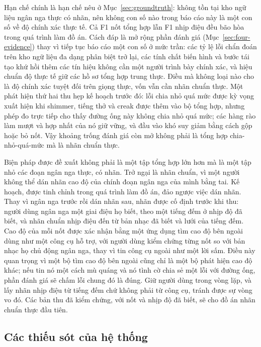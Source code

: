 \documentclass[12pt,a4paper]{article}
\begin{document}
Hạn chế chính là hạn chế nêu ở Mục~\ref{sec:groundtruth}: không tồn tại kho ngữ liệu
ngân nga thực có nhãn, nên không con số nào trong báo cáo này là một con số về độ
chính xác thực tế. Cả F1 nốt tổng hợp lẫn F1 nhịp điệu đều bão hòa trong quá trình
làm đồ án. Cách đáp là mở rộng phần đánh giá (Mục~\ref{sec:four-evidence}) thay vì
tiếp tục báo cáo một con số ở mức trần: các tỷ lệ lỗi chẩn đoán trên kho ngữ liệu đa
dạng phân biệt trở lại, các tính chất biến hình và bước tái tạo khứ hồi thêm các tín
hiệu không cần một người trình bày chính xác, và hiệu chuẩn độ thực tế giữ các hồ sơ
tổng hợp trung thực. Điều mà không loại nào cho là độ chính xác tuyệt đối trên giọng
thực, vốn vẫn cần nhãn chuẩn thực. Một phát hiện thứ hai thu hẹp kế hoạch trước đó:
lỗi chia nhỏ quá mức được kỳ vọng xuất hiện khi shimmer, tiếng thở và creak được
thêm vào bộ tổng hợp, nhưng phép đo trực tiếp cho thấy đường ống này không chia nhỏ
quá mức; các hàng rào làm mượt và hợp nhất của nó giữ vững, và đầu vào khó suy giảm
bằng cách gộp hoặc bỏ nốt. Vậy khoảng trống đánh giá còn mở không phải là tổng hợp
chia-nhỏ-quá-mức mà là nhãn chuẩn thực.

Biện pháp được đề xuất không phải là một tập tổng hợp lớn hơn mà là một tập nhỏ các
đoạn ngân nga thực, có nhãn. Trở ngại là nhãn chuẩn, vì một người không thể dán nhãn
cao độ của chính đoạn ngân nga của mình bằng tai. Kế hoạch, được tinh chỉnh trong
quá trình làm đồ án, đảo ngược việc dán nhãn. Thay vì ngân nga trước rồi dán nhãn
sau, nhãn được cố định trước khi thu: người dùng ngân nga một giai điệu họ biết,
theo một tiếng đếm ở nhịp độ đã biết, và nhãn chuẩn nhịp điệu đến từ bản nhạc đã
biết và lưới của tiếng đếm. Cao độ của mỗi nốt được xác nhận bằng một ứng dụng tìm
cao độ bên ngoài dùng như một công cụ hỗ trợ, với người dùng kiểm chứng từng nốt so
với bản nhạc họ chủ động ngân nga, thay vì tin công cụ ngoài như một lời sấm. Điều
này quan trọng vì một bộ tìm cao độ bên ngoài cũng chỉ là một bộ phát hiện cao độ
khác; nếu tin nó một cách mù quáng và nó tình cờ chia sẻ một lỗi với đường ống, phần
đánh giá sẽ chấm lỗi chung đó là đúng. Giữ người dùng trong vòng lặp, và lấy nhãn
nhịp điệu từ tiếng đếm chứ không phải từ công cụ, tránh được sự vòng vo đó. Các bản
thu đã kiểm chứng, với nốt và nhịp độ đã biết, sẽ cho đồ án nhãn chuẩn thực đầu
tiên.

\subsection{Các thiếu sót của hệ thống}
\end{document}
